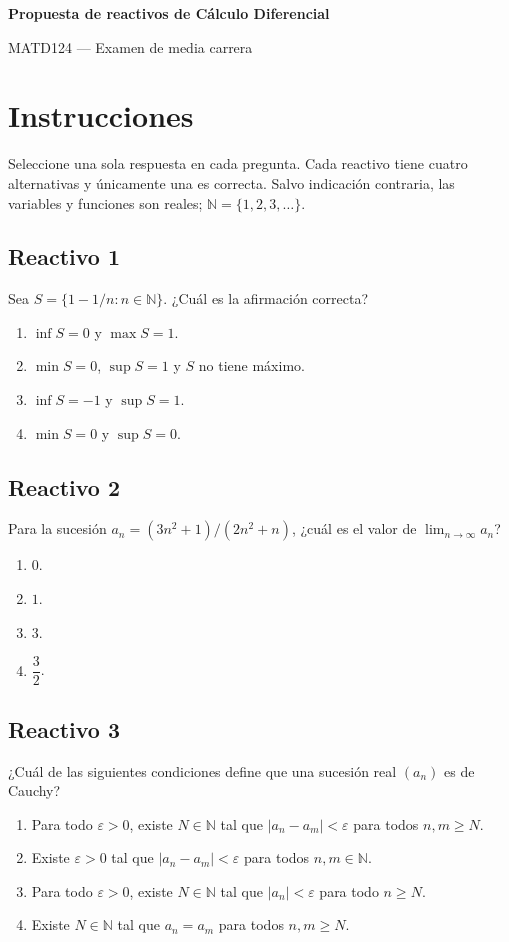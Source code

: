 \documentclass[11pt,a4paper]{article}
\newenvironment{alternativas}{%
  \begin{enumerate}\renewcommand{\labelenumi}{\Alph{enumi})}%
  \setlength{\itemsep}{3pt}\setlength{\parskip}{0pt}%
}{\end{enumerate}}
\newcommand{\reactivo}[2]{\subsection*{Reactivo #1}\noindent #2\par}
\begin{document}
\begin{center}
  {\Large\bfseries Propuesta de reactivos de Cálculo Diferencial}\par
  {\large MATD124 --- Examen de media carrera}
\end{center}


\section*{Instrucciones}
Seleccione una sola respuesta en cada pregunta. Cada reactivo tiene cuatro
alternativas y únicamente una es correcta. Salvo indicación contraria, las
variables y funciones son reales; $\mathbb{N}=\{1,2,3,\ldots\}$.

\reactivo{1}{Sea $S=\{1-1/n:n\in\mathbb{N}\}$. ¿Cuál es la afirmación correcta?}
\begin{alternativas}
  \item $\inf S=0$ y $\max S=1$.
  \item $\min S=0$, $\sup S=1$ y $S$ no tiene máximo.
  \item $\inf S=-1$ y $\sup S=1$.
  \item $\min S=0$ y $\sup S=0$.
\end{alternativas}

\reactivo{2}{Para la sucesión $a_n=(3n^2+1)/(2n^2+n)$, ¿cuál es el valor de
$\displaystyle\lim_{n\to\infty}a_n$?}
\begin{alternativas}
  \item $0$.
  \item $1$.
  \item $3$.
  \item $\dfrac{3}{2}$.
\end{alternativas}

\reactivo{3}{¿Cuál de las siguientes condiciones define que una sucesión
real $(a_n)$ es de Cauchy?}
\begin{alternativas}
  \item Para todo $\varepsilon>0$, existe $N\in\mathbb{N}$ tal que
  $|a_n-a_m|<\varepsilon$ para todos $n,m\geq N$.
  \item Existe $\varepsilon>0$ tal que $|a_n-a_m|<\varepsilon$ para todos
  $n,m\in\mathbb{N}$.
  \item Para todo $\varepsilon>0$, existe $N\in\mathbb{N}$ tal que
  $|a_n|<\varepsilon$ para todo $n\geq N$.
  \item Existe $N\in\mathbb{N}$ tal que $a_n=a_m$ para todos $n,m\geq N$.
\end{alternativas}
\end{document}
